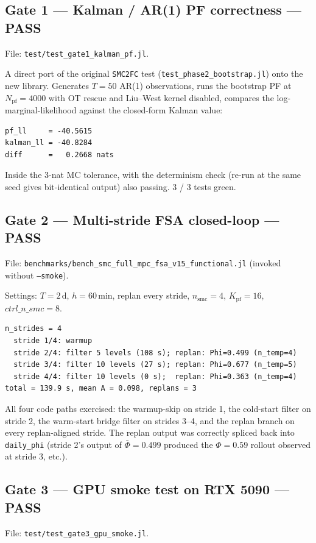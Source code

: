 \documentclass[11pt,a4paper]{article}
\begin{document}
\subsection{Gate 1 --- Kalman / AR(1) PF correctness --- PASS}
File: \texttt{test/test\_gate1\_kalman\_pf.jl}.

A direct port of the original \texttt{SMC2FC} test
(\texttt{test\_phase2\_bootstrap.jl}) onto the new library. Generates
$T{=}50$ AR(1) observations, runs the bootstrap PF at $N_\mathrm{pf}{=}4000$
with OT rescue and Liu--West kernel disabled, compares the
log-marginal-likelihood against the closed-form Kalman value:

\begin{verbatim}
pf_ll     = -40.5615
kalman_ll = -40.8284
diff      =   0.2668 nats
\end{verbatim}

Inside the 3-nat MC tolerance, with the determinism check
(re-run at the same seed gives bit-identical output) also passing.
3 / 3 tests green.

\subsection{Gate 2 --- Multi-stride FSA closed-loop --- PASS}
File: \texttt{benchmarks/bench\_smc\_full\_mpc\_fsa\_v15\_functional.jl}
(invoked without \texttt{--smoke}).

Settings: $T{=}2$\,d, $h{=}60$\,min, replan every stride,
$n_\mathrm{smc}{=}4$, $K_\mathrm{pf}{=}16$, $\mathit{ctrl\_n\_smc}{=}8$.

\begin{verbatim}
n_strides = 4
  stride 1/4: warmup
  stride 2/4: filter 5 levels (108 s); replan: Phi=0.499 (n_temp=4)
  stride 3/4: filter 10 levels (27 s); replan: Phi=0.677 (n_temp=5)
  stride 4/4: filter 10 levels (0 s);  replan: Phi=0.363 (n_temp=4)
total = 139.9 s, mean A = 0.098, replans = 3
\end{verbatim}

All four code paths exercised: the warmup-skip on stride 1, the
cold-start filter on stride 2, the warm-start bridge filter on strides
3--4, and the replan branch on every replan-aligned stride. The replan
output was correctly spliced back into \texttt{daily\_phi} (stride 2's
output of $\bar{\Phi}{=}0.499$ produced the $\Phi{=}0.59$ rollout
observed at stride 3, etc.).

\subsection{Gate 3 --- GPU smoke test on RTX 5090 --- PASS}
File: \texttt{test/test\_gate3\_gpu\_smoke.jl}.
\end{document}
